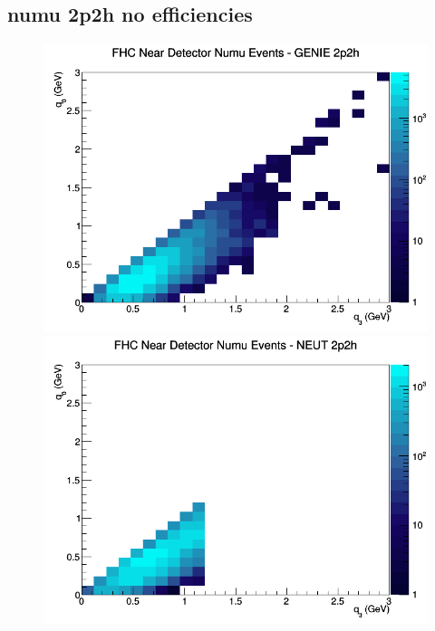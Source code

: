 \subsection{numu 2p2h no efficiencies}
\begin{figure}[h]
\includegraphics[width=\linewidth]{q0_q3/nominal/2p2h_FHC_ND_numu_q3_q0_GENIE.png}
\endminipage
{}
\includegraphics[width=\linewidth]{q0_q3/nominal/2p2h_FHC_ND_numu_q3_q0_NEUT.png}
\endminipage
{}

\end{figure}
